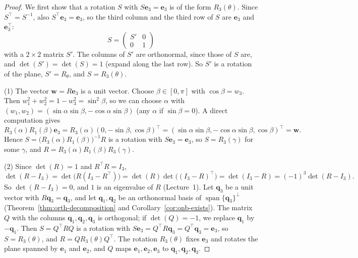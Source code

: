 \documentclass[11pt]{article}
\theoremstyle{definition}
\theoremstyle{plain}
\theoremstyle{remark}
\DeclareMathOperator{\Span}{span}
\begin{document}
\begin{proof}
    We first show that a rotation $S$ with $S\mathbf{e}_3 = \mathbf{e}_3$ is of the form $R_3(\theta)$. Since $S^\top = S^{-1}$, also $S^\top \mathbf{e}_3 = \mathbf{e}_3$, so the third column and the third row of $S$ are $\mathbf{e}_3$ and $\mathbf{e}_3^\top$:
    \[S = \begin{pmatrix} S' & 0 \\ 0 & 1 \end{pmatrix}\]
    with a $2 \times 2$ matrix $S'$. The columns of $S'$ are orthonormal, since those of $S$ are, and $\det(S') = \det(S) = 1$ (expand along the last row). So $S'$ is a rotation of the plane, $S' = R_\theta$, and $S = R_3(\theta)$.

    (1) The vector $\mathbf{w} = R\mathbf{e}_3$ is a unit vector. Choose $\beta \in [0, \pi]$ with $\cos\beta = w_3$. Then $w_1^2 + w_2^2 = 1 - w_3^2 = \sin^2\beta$, so we can choose $\alpha$ with $(w_1, w_2) = (\sin\alpha\sin\beta, -\cos\alpha\sin\beta)$ (any $\alpha$ if $\sin\beta = 0$). A direct computation gives
    \[R_3(\alpha)R_1(\beta)\mathbf{e}_3 = R_3(\alpha)(0, -\sin\beta, \cos\beta)^\top = (\sin\alpha\sin\beta, -\cos\alpha\sin\beta, \cos\beta)^\top = \mathbf{w}.\]
    Hence $S = \big(R_3(\alpha)R_1(\beta)\big)^{-1}R$ is a rotation with $S\mathbf{e}_3 = \mathbf{e}_3$, so $S = R_3(\gamma)$ for some $\gamma$, and $R = R_3(\alpha)R_1(\beta)R_3(\gamma)$.

    (2) Since $\det(R) = 1$ and $R^\top R = I_3$,
    \[\det(R - I_3) = \det\big(R(I_3 - R^\top)\big) = \det(R)\det\big((I_3 - R)^\top\big) = \det(I_3 - R) = (-1)^3\det(R - I_3).\]
    So $\det(R - I_3) = 0$, and $1$ is an eigenvalue of $R$ (Lecture~1). Let $\mathbf{q}_3$ be a unit vector with $R\mathbf{q}_3 = \mathbf{q}_3$, and let $\mathbf{q}_1, \mathbf{q}_2$ be an orthonormal basis of $\Span\{\mathbf{q}_3\}^\perp$ (Theorem~\ref{thm:orth-decomposition} and Corollary~\ref{cor:onb-exists}). The matrix $Q$ with the columns $\mathbf{q}_1, \mathbf{q}_2, \mathbf{q}_3$ is orthogonal; if $\det(Q) = -1$, we replace $\mathbf{q}_1$ by $-\mathbf{q}_1$. Then $S = Q^\top RQ$ is a rotation with $S\mathbf{e}_3 = Q^\top R\mathbf{q}_3 = Q^\top \mathbf{q}_3 = \mathbf{e}_3$, so $S = R_3(\theta)$, and $R = QR_3(\theta)Q^\top$. The rotation $R_3(\theta)$ fixes $\mathbf{e}_3$ and rotates the plane spanned by $\mathbf{e}_1$ and $\mathbf{e}_2$, and $Q$ maps $\mathbf{e}_1, \mathbf{e}_2, \mathbf{e}_3$ to $\mathbf{q}_1, \mathbf{q}_2, \mathbf{q}_3$.
\end{proof}
\end{document}
